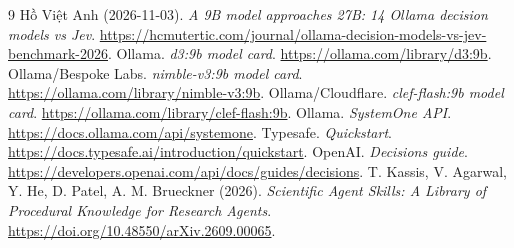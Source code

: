 \documentclass[11pt,a4paper]{article}
\begin{document}
\begin{thebibliography}{9}
 Hồ Việt Anh (2026-11-03).
\emph{A 9B model approaches 27B: 14 Ollama decision models vs Jev}.
\url{https://hcmutertic.com/journal/ollama-decision-models-vs-jev-benchmark-2026}.
 Ollama. \emph{d3:9b model card}.
\url{https://ollama.com/library/d3:9b}.
 Ollama/Bespoke Labs. \emph{nimble-v3:9b model card}.
\url{https://ollama.com/library/nimble-v3:9b}.
 Ollama/Cloudflare. \emph{clef-flash:9b model card}.
\url{https://ollama.com/library/clef-flash:9b}.
 Ollama. \emph{SystemOne API}.
\url{https://docs.ollama.com/api/systemone}.
 Typesafe. \emph{Quickstart}.
\url{https://docs.typesafe.ai/introduction/quickstart}.
 OpenAI. \emph{Decisions guide}.
\url{https://developers.openai.com/api/docs/guides/decisions}.
 T. Kassis, V. Agarwal, Y. He, D. Patel, A. M. Brueckner (2026).
\emph{Scientific Agent Skills: A Library of Procedural Knowledge for Research Agents}.
\url{https://doi.org/10.48550/arXiv.2609.00065}.
\end{thebibliography}
\end{document}
